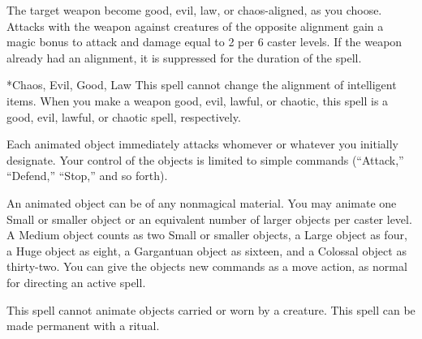 
\begin{spellheader}
\end{spellheader}
\begin{spellcontent}
    \begin{spelltargetinginfo}
    \end{spelltargetinginfo}
    \begin{spelleffects}
        \spelleffect The target weapon become good, evil, law, or chaos-aligned, as you choose. Attacks with the weapon against creatures of the opposite alignment gain a magic bonus to attack and damage equal to 2  per 6 caster levels. If the weapon already had an alignment, it is suppressed for the duration of the spell.
    \end{spelleffects}
\end{spellcontent}
\begin{spellfooter}
    *{Chaos, Evil, Good, Law}
    \spellnotes This spell cannot change the alignment of intelligent items. When you make a weapon good, evil, lawful, or chaotic, this spell is a good, evil, lawful, or chaotic spell, respectively.
\end{spellfooter}

\begin{spellheader}
\end{spellheader}
\begin{spellcontent}
    \begin{spelltargetinginfo}
    \end{spelltargetinginfo}
    \begin{spelleffects}
        \spelleffect Each animated object immediately attacks whomever or whatever you initially designate. Your control of the objects is limited to simple commands (``Attack,'' ``Defend,'' ``Stop,'' and so forth).
        \par An animated object can be of any nonmagical material. You may animate one Small or smaller object or an equivalent number of larger objects per caster level. A Medium object counts as two Small or smaller objects, a Large object as four, a Huge object as eight, a Gargantuan object as sixteen, and a Colossal object as thirty-two. You can give the objects new commands as a move action, as normal for directing an active spell.
        \spelldur{\durshort}
    \end{spelleffects}
\end{spellcontent}
\begin{spellfooter}
    \spellnotes This spell cannot animate objects carried or worn by a creature. This spell can be made permanent with a  ritual.
\end{spellfooter}

